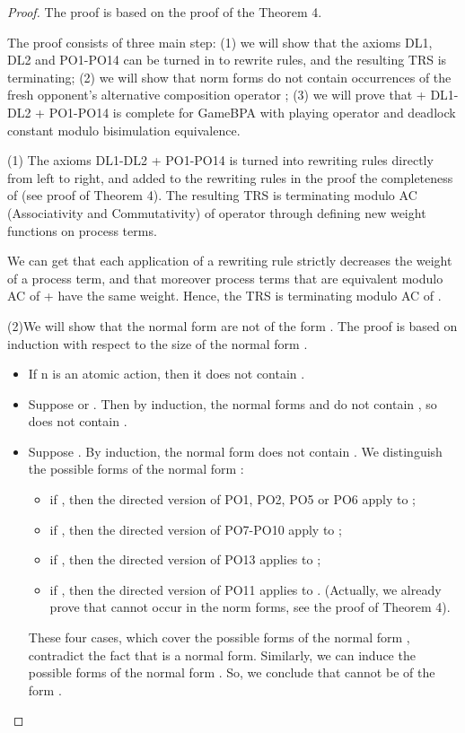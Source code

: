 \documentclass{fac}
\begin{document}
\begin{proof}
The proof is based on the proof of the Theorem 4.

The proof consists of three main step: (1) we will show that the axioms DL1, DL2 and PO1-PO14 can be turned in to rewrite rules, and the resulting TRS is terminating; (2) we will show that norm forms do not contain occurrences of the fresh opponent's alternative composition operator ; (3) we will prove that  + DL1-DL2 + PO1-PO14 is complete for GameBPA with playing operator and deadlock constant modulo bisimulation equivalence.

(1) The axioms DL1-DL2 + PO1-PO14 is turned into rewriting rules directly from left to right, and added to the rewriting rules in the proof the completeness of  (see proof of Theorem 4). The resulting TRS is terminating modulo AC (Associativity and Commutativity) of  operator through defining new weight functions on process terms.









We can get that each application of a rewriting rule strictly decreases the weight of a process term, and that moreover process terms that are equivalent modulo AC of + have the same weight. Hence, the TRS is terminating modulo AC of .

(2)We will show that the normal form  are not of the form . The proof is based on induction with respect to the size of the normal form .

\begin{itemize}
  \item If n is an atomic action, then it does not contain .
  \item Suppose  or . Then by induction, the normal forms  and  do not contain , so  does not contain .
  \item Suppose . By induction, the normal form  does not contain . We distinguish the possible forms of the normal form :
  \begin{itemize}
    \item if , then the directed version of PO1, PO2, PO5 or PO6 apply to ;
    \item if , then the directed version of PO7-PO10 apply to ;
    \item if , then the directed version of PO13 applies to ;
    \item if , then the directed version of PO11 applies to . (Actually, we already prove that  cannot occur in the norm forms, see the proof of Theorem 4).
  \end{itemize}
   These four cases, which cover the possible forms of the normal form , contradict the fact that  is a normal form. Similarly, we can induce the possible forms of the normal form . So, we conclude that  cannot be of the form .
\end{itemize}


\end{proof}
\end{document}

